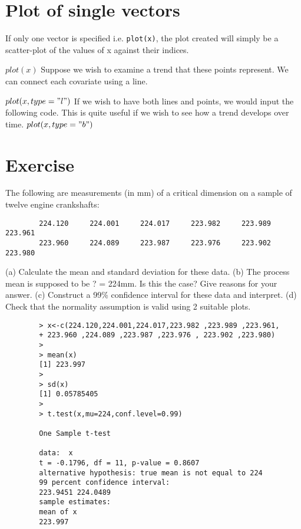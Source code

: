 \documentclass[a4paper,12pt]{article}
\begin{document}
\begin{itemize}
\begin{itemize}
		\section{Plot of single vectors}
		If only one vector is specified i.e. \texttt{plot(x)},  the plot created will simply be a scatter-plot of the values of x against their indices.
		
		$plot(x)$
		Suppose we wish to examine a trend that these points represent. We can connect each covariate using a line.
		
		$plot(x, type = "l")$
		If we wish to have both lines and points, we would input the following code. This is quite useful if we wish to see how a trend develops over time.
		$plot(x, type = "b")$
		
		
		
		
		
		
		
		
		
		\section{Exercise} The following are measurements (in mm) of a critical
		dimension on a sample of twelve engine crankshafts:
		
		\begin{verbatim}
		224.120 	224.001 	224.017 	223.982 	223.989 	223.961
		223.960 	224.089 	223.987 	223.976 	223.902 	223.980
		\end{verbatim}
		(a) Calculate the mean and standard deviation for these data.
		(b) The process mean is supposed to be ? = 224mm. Is this the
		case? Give reasons for your answer.
		(c) Construct a 99\% confidence interval for these data and interpret.
		(d) Check that the normality assumption is valid using 2 suitable plots.
		
		\begin{verbatim}
		> x<-c(224.120,224.001,224.017,223.982 ,223.989 ,223.961,
		+ 223.960 ,224.089 ,223.987 ,223.976 , 223.902 ,223.980)
		>
		> mean(x)
		[1] 223.997
		>
		> sd(x)
		[1] 0.05785405
		>
		> t.test(x,mu=224,conf.level=0.99)
		
		One Sample t-test
		
		data:  x
		t = -0.1796, df = 11, p-value = 0.8607
		alternative hypothesis: true mean is not equal to 224
		99 percent confidence interval:
		223.9451 224.0489
		sample estimates:
		mean of x
		223.997
		
		\end{verbatim}

\end{itemize}
\end{itemize}
\end{document}
